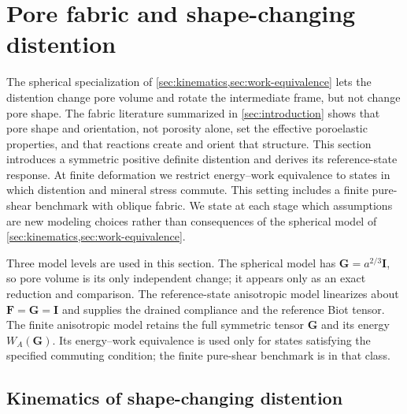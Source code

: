 \section{Pore fabric and shape-changing distention}
\label{sec:pore-fabric}

The spherical specialization of
\cref{sec:kinematics,sec:work-equivalence} lets the distention change pore
volume and rotate the intermediate frame, but not change pore shape. The
fabric literature summarized in \cref{sec:introduction} shows that pore
shape and orientation, not porosity alone, set the effective poroelastic
properties, and that reactions create and orient that structure. This
section introduces a symmetric positive definite distention and derives
its reference-state response. At finite deformation we restrict energy--work
equivalence to states in which distention and mineral stress commute.
This setting includes a finite pure-shear benchmark with oblique fabric.
We state at each stage which assumptions are new modeling choices rather
than consequences of the spherical model of
\cref{sec:kinematics,sec:work-equivalence}.

Three model levels are used in this section. The spherical model has
\(\mathbf G=a^{2/3}\mathbf I\), so pore volume is its only independent
change; it appears only as an exact reduction and comparison. The
reference-state anisotropic model linearizes about
\(\mathbf F=\mathbf G=\mathbf I\) and supplies the drained compliance and
the reference Biot tensor. The finite anisotropic model retains the full
symmetric tensor \(\mathbf G\) and its energy \(W_A(\mathbf G)\). Its
energy--work equivalence is used only for states satisfying the specified
commuting condition; the finite pure-shear benchmark is in that class.

\subsection{Kinematics of shape-changing distention}
\label{sec:fabric-kinematics}

